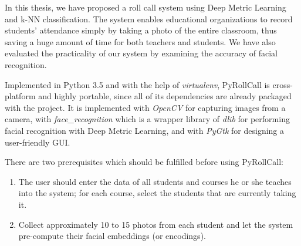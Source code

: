In this thesis, we have proposed a roll call system using Deep Metric Learning and k-NN classification.
The system enables educational organizations to record students' attendance simply by taking a photo of
the entire classroom, thus saving a huge amount of time for both teachers and students.
We have also evaluated the practicality of our system by examining the accuracy of facial recognition.
\vspace{0.5cm}

Implemented in Python 3.5 and with the help of \emph{virtualenv}, PyRollCall is cross-platform and highly portable,
since all of its dependencies are already packaged with the project. It is implemented with \emph{OpenCV}
for capturing images from a camera, with \emph{face\_recognition} which is a wrapper library of \emph{dlib}
for performing facial recognition with Deep Metric Learning, and with \emph{PyGtk} for designing a user-friendly GUI.
\vspace{0.5cm}

There are two prerequisites which should be fulfilled before using PyRollCall:

\begin{enumerate}
  \item The user should enter the data of all students and courses he or she teaches into the system; for each course, select the students that are currently taking it.
  \item Collect approximately 10 to 15 photos from each student and let the system pre-compute their facial embeddings (or encodings).
\end{enumerate}
